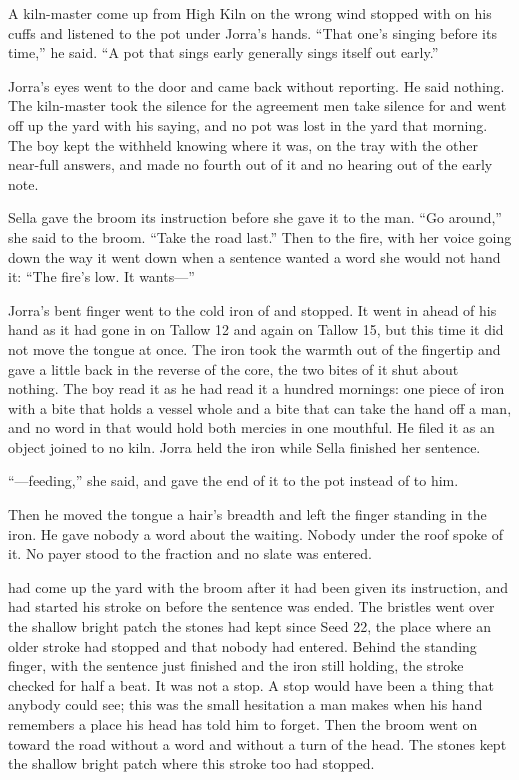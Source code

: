 A kiln-master come up from High Kiln on the wrong wind stopped with  on his cuffs and listened to the pot under Jorra's hands. “That one's singing before its time,” he said. “A pot that sings early generally sings itself out early.”

Jorra's eyes went to the door and came back without reporting. He said nothing. The kiln-master took the silence for the agreement men take silence for and went off up the yard with his saying, and no pot was lost in the yard that morning. The boy kept the withheld knowing where it was, on the tray with the other near-full answers, and made no fourth out of it and no hearing out of the early note.

\scenebreak

Sella gave the broom its instruction before she gave it to the man. “Go around,” she said to the broom. “Take the road last.” Then to the fire, with her voice going down the way it went down when a sentence wanted a word she would not hand it: “The fire's low. It wants---”

Jorra's bent finger went to the cold iron of  and stopped. It went in ahead of his hand as it had gone in on Tallow 12 and again on Tallow 15, but this time it did not move the tongue at once. The iron took the warmth out of the fingertip and gave a little back in the reverse of the core, the two bites of it shut about nothing. The boy read it as he had read it a hundred mornings: one piece of iron with a bite that holds a vessel whole and a bite that can take the hand off a man, and no word in  that would hold both mercies in one mouthful. He filed it as an object joined to no kiln. Jorra held the iron while Sella finished her sentence.

“---feeding,” she said, and gave the end of it to the pot instead of to him.

Then he moved the tongue a hair's breadth and left the finger standing in the iron. He gave nobody a word about the waiting. Nobody under the roof spoke of it. No payer stood to the fraction and no slate was entered.

 had come up the yard with the broom after it had been given its instruction, and had started his stroke on  before the sentence was ended. The bristles went over the shallow bright patch the stones had kept since Seed 22, the place where an older stroke had stopped and that nobody had entered. Behind the standing finger, with the sentence just finished and the iron still holding, the stroke checked for half a beat. It was not a stop. A stop would have been a thing that anybody could see; this was the small hesitation a man makes when his hand remembers a place his head has told him to forget. Then the broom went on toward the road without a word and without a turn of the head. The stones kept the shallow bright patch where this stroke too had stopped.

